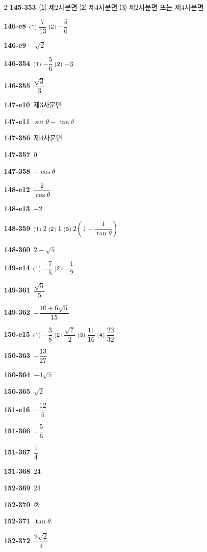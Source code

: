 \documentclass[10pt,a4paper]{article}
\begin{document}
\begin{multicols}{2}
\noindent\textbf{145-353}\ ⑴ 제$2$사분면 ⑵ 제$4$사분면 ⑶ 제$2$사분면 또는 제$4$사분면\par
\noindent\textbf{146-e8}\ ⑴ $\dfrac{7}{13}$ ⑵ $-\dfrac{5}{6}$\par
\noindent\textbf{146-e9}\ $-\sqrt{2}$\par
\noindent\textbf{146-354}\ ⑴ $-\dfrac{5}{6}$ ⑵ $-3$\par
\noindent\textbf{146-355}\ $\dfrac{\sqrt{3}}{3}$\par
\noindent\textbf{147-e10}\ 제$3$사분면\par
\noindent\textbf{147-e11}\ $\sin\theta-\tan\theta$\par
\noindent\textbf{147-356}\ 제$4$사분면\par
\noindent\textbf{147-357}\ $0$\par
\noindent\textbf{147-358}\ $-\cos\theta$\par
\noindent\textbf{148-e12}\ $\dfrac{2}{\cos\theta}$\par
\noindent\textbf{148-e13}\ $-2$\par
\noindent\textbf{148-359}\ ⑴ $2$ ⑵ $1$ ⑶ $2\left(1+\dfrac{1}{\tan\theta}\right)$\par
\noindent\textbf{148-360}\ $2-\sqrt{5}$\par
\noindent\textbf{149-e14}\ ⑴ $-\dfrac{7}{5}$ ⑵ $-\dfrac{1}{2}$\par
\noindent\textbf{149-361}\ $\dfrac{\sqrt{5}}{5}$\par
\noindent\textbf{149-362}\ $-\dfrac{10+6\sqrt{5}}{15}$\par
\noindent\textbf{150-e15}\ ⑴ $-\dfrac{3}{8}$ ⑵ $\dfrac{\sqrt{7}}{2}$ ⑶ $\dfrac{11}{16}$ ⑷ $\dfrac{23}{32}$\par
\noindent\textbf{150-363}\ $-\dfrac{13}{27}$\par
\noindent\textbf{150-364}\ $-4\sqrt{5}$\par
\noindent\textbf{150-365}\ $\sqrt{2}$\par
\noindent\textbf{151-e16}\ $-\dfrac{12}{5}$\par
\noindent\textbf{151-366}\ $-\dfrac{5}{6}$\par
\noindent\textbf{151-367}\ $\dfrac{1}{4}$\par
\noindent\textbf{151-368}\ $24$\par
\noindent\textbf{152-369}\ $23$\par
\noindent\textbf{152-370}\ ②\par
\noindent\textbf{152-371}\ $\tan\theta$\par
\noindent\textbf{152-372}\ $\dfrac{9\sqrt{2}}{4}$\par

\end{multicols}
\end{document}

